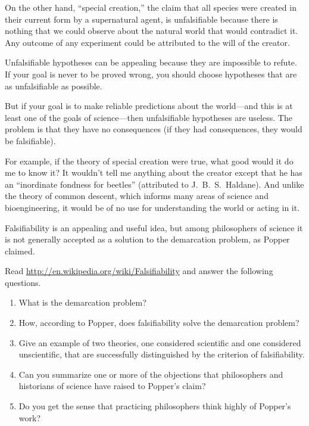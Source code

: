 \documentclass[10pt]{book}
\begin{document}
On the other hand, ``special creation,'' the claim that all species
were created in their current form by a supernatural agent, is
unfalsifiable because there is nothing that we could observe about the
natural world that would contradict it.  Any outcome of any experiment
could be attributed to the will of the creator.

Unfalsifiable hypotheses can be appealing because
they are impossible to refute.  If your goal is never to be
proved wrong, you should choose hypotheses that are as
unfalsifiable as possible.

But if your goal is to make reliable predictions about the world---and
this is at least one of the goals of science---then unfalsifiable
hypotheses are useless.  The problem is that they have
no consequences (if they had consequences, they would be
falsifiable).

For example, if the theory of special creation were true, what good
would it do me to know it?  It wouldn't tell me anything about the
creator except that he has an ``inordinate fondness for beetles''
(attributed to J.~B.~S.~Haldane).  And unlike the
theory of common descent, which informs many areas of science
and bioengineering, it would be of no use for understanding
the world or acting in it.

\begin{exercise}

Falsifiability is an appealing and useful idea, but among
philosophers of science it is not generally accepted
as a solution to the demarcation problem, as Popper claimed.

Read \url{http://en.wikipedia.org/wiki/Falsifiability} and answer the following
questions.

\begin{enumerate}

\item What is the demarcation problem?

\item How, according to Popper, does falsifiability solve the
demarcation problem?

\item Give an example of two theories, one considered scientific
and one considered unscientific, that are successfully distinguished
by the criterion of falsifiability.

\item Can you summarize one or more of the objections that
philosophers and historians of science have raised to Popper's
claim?

\item Do you get the sense that practicing philosophers think
highly of Popper's work?

\end{enumerate}

\end{exercise}
\end{document}

